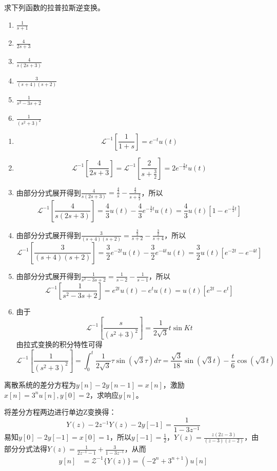 \documentclass[answers]{exam}  %
\begin{document}
\begin{questions}
\question 求下列函数的拉普拉斯逆变换。
\begin{enumerate}[(1)]
\item $\frac{1}{s+1}$
\item $\frac{4}{2s+3}$
\item $\frac{4}{s(2s+3)}$
\item $\frac{3}{(s+4)(s+2)}$
\item $\frac{1}{s^2-3s+2}$
\item $\frac{1}{(s^2+3)^2}$
\end{enumerate}
\begin{solution}
\begin{enumerate}[(1)]
	\item $$\mathcal{L}^{-1}[\frac{1}{1+s}]=e^{-t}u(t)$$
	\item $$\mathcal{L}^{-1}[\frac{4}{2s+3}]=\mathcal{L}^{-1}[\frac{2}{s+\frac{3}{2}}]=2e^{-\frac{3}{2}t}u(t)$$
	\item 由部分分式展开得到$\frac{4}{s(2s+3)}=\frac{\frac{4}{3}}{s}-\frac{\frac{4}{3}}{s+\frac{3}{2}}$，所以$$\mathcal{L}^{-1}[\frac{4}{s(2s+3)}]=\frac{4}{3}u(t)-\frac{4}{3}e^{-\frac{3}{2}t}u(t)=\frac{4}{3}u(t)[1-e^{-\frac{3}{2}t}]$$
	\item 由部分分式展开得到$\frac{3}{(s+4)(s+2)}=\frac{\frac{3}{2}}{s+2}-\frac{\frac{3}{2}}{s+4}$，所以$$\mathcal{L}^{-1}[\frac{3}{(s+4)(s+2)}]=\frac{3}{2}e^{-2t}u(t)-\frac{3}{2}e^{-4t}u(t)=\frac{3}{2}u(t)[e^{-2t}-e^{-4t}]$$
	\item 由部分分式展开得到$\frac{1}{s^2-3s+2}=\frac{1}{s-2}-\frac{1}{s-1}$，所以$$\mathcal{L}^{-1}[\frac{1}{s^2-3s+2}]=e^{2t}u(t)-e^{t}u(t)=u(t)[e^{2t}-e^{t}]$$
	\item 由于$$\mathcal{L}^{-1}[\frac{s}{(s^2+3)^2}]=\frac{1}{2\sqrt{3}}t\sin Kt$$由拉式变换的积分特性可得
	$$\mathcal{L}^{-1}[\frac{1}{(s^2+3)^2}]=\int_{0}^{t}\frac{1}{2\sqrt{3}}\tau\sin (\sqrt{3}\tau) d\tau=\frac{\sqrt{3}}{18}\sin (\sqrt{3}t)-\frac{t}{6}\cos(\sqrt{3}t)$$
\end{enumerate}
\end{solution}

\question 离散系统的差分方程为$y[n]-2y[n-1]=x[n]$，激励$x[n]=3^{n}u[n],y[0]=2$，求响应$y[n]$。
\begin{solution}
将差分方程两边进行单边Z变换得：$$Y(z)-2z^{-1}Y(z)-2y[-1]=\frac{1}{1-3z^{-1}}$$易知$y[0]-2y[-1]=x[0]=1$，所以$y[-1]=\frac{1}{2}$，$Y(z)=\frac{z(2z-3)}{(z-3)(z-2)}$，由部分分式法得$Y(z)=\frac{1}{2z^{-1}-1}+\frac{3}{1-3z^{-1}}$，从而\begin{align*}
	y[n]&=\mathcal{Z}^{-1}\{Y(z)\}=(-2^{n}+3^{n+1})u[n]
\end{align*}
\end{solution}


\end{questions}
\end{document}
